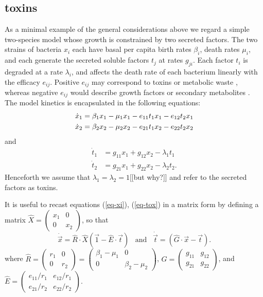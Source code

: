 \documentclass[a4paper,11pt]{article}
\numberwithin{equation}{section} %
\begin{document}
\subsection{toxins}
As a minimal example of the general considerations above we regard a simple two-species model whose growth is constrained by two secreted factors. The two strains of bacteria $x_i$ each have basal per capita birth rates $\beta_i$, death rates $\mu_i$, and each generate the secreted soluble factors $t_j$ at rates $g_{ji}$. Each factor $t_i$ is degraded at a  rate $\lambda_i$, and affects the death rate of each bacterium linearly with the efficacy $e_{ij}$. Positive $e_{ij}$ may correspond to toxins or  metabolic waste \cite{VanMelderen2009,Rankin2012}\cite{a review, surely}, whereas negative $e_{ij}$ would describe growth factors or secondary metabolites \cite{need some}. The model kinetics is encapsulated in the following equations:
\begin{align}
\dot{x}_1 &= \beta_1 x_1 - \mu_1 x_1 - e_{11} t_1 x_1 - e_{12} t_2 x_1 \notag \\
\dot{x}_2 &= \beta_2 x_2 - \mu_2 x_2 - e_{21} t_1 x_2 - e_{22} t_2 x_2 \label{eq-x-tox}
\end{align}
and
\begin{align}
\dot{t}_1 &= g_{11} x_1 + g_{12}x_2 - \lambda_1 t_1  \nonumber \\
\dot{t}_2 &= g_{21} x_1 + g_{22}x_2 - \lambda_2 t_2. \label{eq-tox}
\end{align}
Henceforth we assume that $\lambda_1=\lambda_2=1$[[but why?]] and refer to the secreted factors as toxins.

It is useful to recast equations (\ref{eq-xi}), (\ref{eq-tox}) in a matrix form by defining a matrix $\hat{X} = \begin{pmatrix}
x_1 & 0 \\
0 & x_2
\end{pmatrix}$, so that
\begin{equation}
\dot{\vec{x}} = \hat{R}\cdot\hat{X} \left( \vec{1} - \hat{E}\cdot \vec{t} \right)\;\;\;\text{and}\;\;\;
\dot{\vec{t}} =  \left( \hat{G}\cdot \vec{x} - \vec{t} \right). \label{xdot-tdot-eqn}
\end{equation}
where $\hat{R} = \begin{pmatrix}
r_1 & 0 \\
0 & r_2
\end{pmatrix} = \begin{pmatrix}
\beta_1-\mu_1 & 0 \\
0 & \beta_2-\mu_2
\end{pmatrix}$, $\hat{G} = \begin{pmatrix}
g_{11} & g_{12} \\
g_{21} & g_{22}
\end{pmatrix}$, and $\hat{E} = \begin{pmatrix}
e_{11}/r_1 & e_{12}/r_1 \\
e_{21}/r_2 & e_{22}/r_2
\end{pmatrix}$. 
\end{document}
